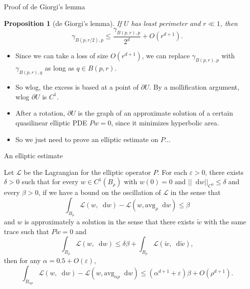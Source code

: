 \documentclass[10pt]{beamer}
\newcommand*\dif{\mathop{}\!\mathrm{d}}
\newcommand{\avg}{\mathrm{avg}}
\newtheorem{proposition}{Proposition}
\begin{document}
\begin{frame}{Proof of de Giorgi's lemma}
\begin{proposition}[de Giorgi's lemma]
If $U$ has least perimeter and $r \ll 1$, then
$$\gamma_{B(p, r/2), p} \leq \frac{\gamma_{B(p, r), p}}{2^d} + O(r^{d + 1}).$$
\end{proposition}

\begin{itemize}
\item Since we can take a loss of size $O(r^{d + 1})$, we can replace $\gamma_{B(p, r), p}$ with $\gamma_{B(p, r), q}$ as long as $q \in B(p, r)$.
\item So wlog, the excess is based at a point of $\partial U$. By a mollification argument, wlog $\partial U$ is $C^1$.
\item After a rotation, $\partial U$ is the graph of an approximate solution of a certain quasilinear elliptic PDE $Pw = 0$, since it minimizes hyperbolic area.
\item So we just need to prove an elliptic estimate on $P$...
\end{itemize}
\end{frame}

\begin{frame}{An elliptic estimate}
\begin{lemma}
Let $\mathscr L$ be the Lagrangian for the elliptic operator $P$.
For each $\varepsilon > 0$, there exists $\delta > 0$ such that for every $w \in C^1(B_\rho)$ with $w(0) = 0$ and $||\dif w||_{C^0} \leq \delta$ and every $\beta > 0$, if we have a bound on the oscillation of $\mathscr L$ in the sense that
$$\int_{B_\rho} \mathscr L(w, \dif w) - \mathscr L(w, \avg_\rho \dif w) \leq \beta$$
and $w$ is approximately a solution in the sense that there exists $\tilde w$ with the same trace such that $P\tilde w = 0$ and
$$\int_{B_\rho} \mathscr L(w, \dif w) \leq \delta \beta + \int_{B_\rho} \mathscr L(\tilde w, \dif \tilde w),$$
then for any $\alpha = 0.5 + O(\varepsilon)$,
$$\int_{B_{\alpha \rho}} \mathscr L(w, \dif w) - \mathscr L(w, \avg_{\alpha \rho} \dif w) \leq (\alpha^{d + 1} + \varepsilon) \beta + O(\rho^{d + 1}).$$
\end{lemma}
\end{frame}
\end{document}
